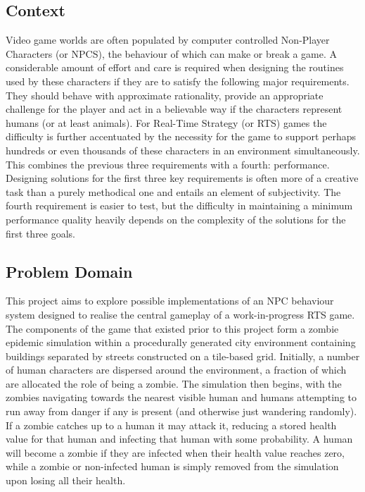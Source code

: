 \documentclass[12pt,a4paper]{article}
\begin{document}
\subsection{Context}\noindent
Video game worlds are often populated by computer controlled Non-Player Characters (or NPCS), the behaviour of which can make or break a game. A considerable amount of effort and care is required when designing the routines used by these characters if they are to satisfy the following major requirements. They should behave with approximate rationality, provide an appropriate challenge for the player and act in a believable way if the characters represent humans (or at least animals). For Real-Time Strategy (or RTS) games the difficulty is further accentuated by the necessity for the game to support perhaps hundreds or even thousands of these characters in an environment simultaneously. This combines the previous three requirements with a fourth: performance. Designing solutions for the first three key requirements is often more of a creative task than a purely methodical one and entails an element of subjectivity. The fourth requirement is easier to test, but the difficulty in maintaining a minimum performance quality heavily depends on the complexity of the solutions for the first three goals.

\subsection{Problem Domain}\noindent
This project aims to explore possible implementations of an NPC behaviour system designed to realise the central gameplay of a work-in-progress RTS game. The components of the game that existed prior to this project form a zombie epidemic simulation within a procedurally generated city environment containing buildings separated by streets constructed on a tile-based grid. Initially, a number of human characters are dispersed around the environment, a fraction of which are allocated the role of being a zombie. The simulation then begins, with the zombies navigating towards the nearest visible human and humans attempting to run away from danger if any is present (and otherwise just wandering randomly). If a zombie catches up to a human it may attack it, reducing a stored health value for that human and infecting that human with some probability. A human will become a zombie if they are infected when their health value reaches zero, while a zombie or non-infected human is simply removed from the simulation upon losing all their health.
\end{document}
